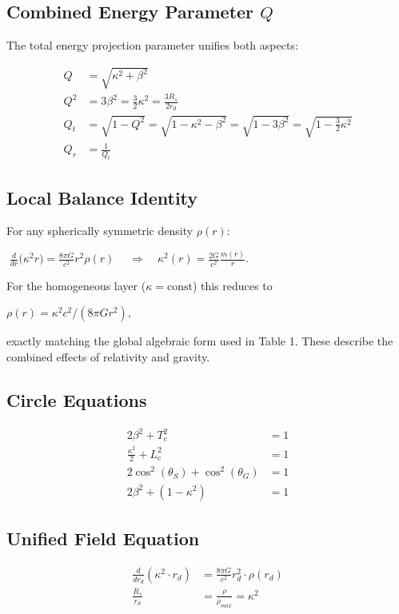\documentclass{article}
\begin{document}
\subsection{Combined Energy Parameter $Q$}
The total energy projection parameter unifies both aspects:

\begin{align}
    Q &=\sqrt{\kappa^2 + \beta^2}  \\
    Q^{2}&= 3\beta^2 = \frac{3}{2}\kappa^2 = \frac{3R_s}{2r_{d}} \\
    Q_t &= \sqrt{1-Q^2} = \sqrt{1-\kappa^2-\beta^2} = \sqrt{1-3\beta^2} = \sqrt{1-\frac{3}{2}\kappa^2} \\
    Q_r &= \frac{1}{Q_t}
\end{align}


\subsection*{Local Balance Identity}

For any spherically symmetric density $\rho(r)$:

$\boxed{\;
   \frac{d}{dr}\bigl(\kappa^{2}r\bigr)
   =\frac{8\pi G}{c^{2}} r^{2}\rho(r)
\;}
\quad\Longrightarrow\quad
\kappa^{2}(r)=\frac{2G}{c^{2}}\frac{m(r)}{r}$.

For the homogeneous layer ($\kappa=\text{const}$) this reduces to

$\rho(r)=\kappa^{2}c^{2}/(8\pi G r^{2})$,

exactly matching the global algebraic form used in Table 1.
These describe the combined effects of relativity and gravity.

\subsection{Circle Equations}

\begin{align}
    2\beta^2 + T_c^2 &= 1 \\
    \frac{\kappa^2}{2} + L_c^2 &= 1 \\
    2\cos^2(\theta_S) + \cos^2(\theta_G) &= 1 \\
    2\beta^2 + (1-\kappa^2) &= 1
\end{align}

\subsection{Unified Field Equation}

\begin{align}
    \frac{d}{dr_{d}}(\kappa^2 \cdot r_{d}) &= \frac{8\pi G}{c^2} r_{d}^2 \cdot \rho(r_{d}) \\
    \frac{R_s}{r_{d}} &= \frac{\rho}{\rho_{max}} = \kappa^2
\end{align}
\end{document}
